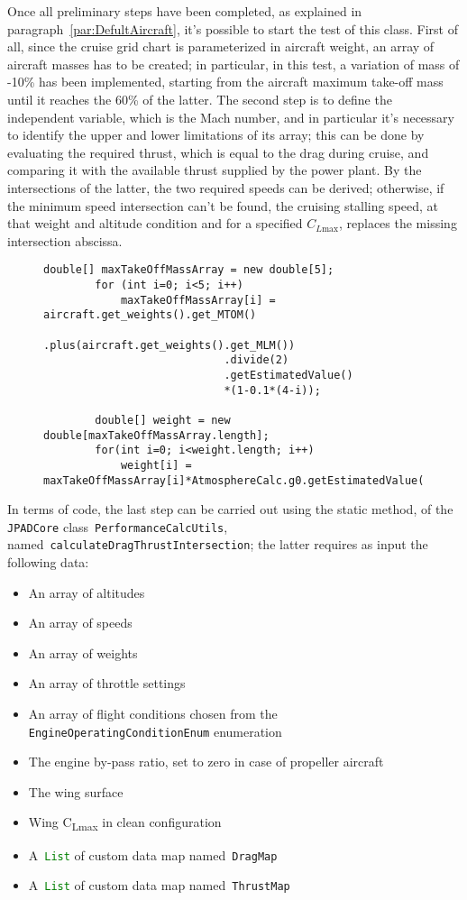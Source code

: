\bigskip
\noindent
Once all preliminary steps have been completed, as explained in paragraph~\ref{par:DefultAircraft}, it's possible to start the test of this class. 
%
First of all, since the cruise grid chart is parameterized in aircraft weight, an array of aircraft masses has to be created; in particular, in this test, a variation of mass of -10\% has been implemented, starting from the aircraft maximum take-off mass until it reaches the 60\% of the latter. 
%
The second step is to define the independent variable, which is the Mach number, and in particular it's necessary to identify the upper and lower limitations of its array; this can be done by evaluating the required thrust, which is equal to the drag during cruise, and comparing it with the available thrust supplied by the power plant.
%
\noindent
By the intersections of the latter, the two required speeds can be derived; otherwise, if the minimum speed intersection can't be found, the cruising stalling speed, at that weight and altitude condition and for a specified $C_{L\text{max}}$, replaces the missing intersection abscissa.
%
\begin{figure}[t]
\begin{lstlisting}[caption={Mass variation in Specific Range test - B747-100B}, captionpos=b, tabsize=2]
		double[] maxTakeOffMassArray = new double[5];
		for (int i=0; i<5; i++)
			maxTakeOffMassArray[i] =	aircraft.get_weights().get_MTOM()
							.plus(aircraft.get_weights().get_MLM())
							.divide(2)
							.getEstimatedValue()
							*(1-0.1*(4-i));

		double[] weight = new double[maxTakeOffMassArray.length];
		for(int i=0; i<weight.length; i++)
			weight[i] = maxTakeOffMassArray[i]*AtmosphereCalc.g0.getEstimatedValue();
\end{lstlisting}
\end{figure}
%
In terms of code, the last step can be carried out using the static method, of the \lstinline[language=Java]!JPADCore! class~\lstinline[language=Java]!PerformanceCalcUtils!, named~\lstinline[language=Java]!calculateDragThrustIntersection!; the latter requires as input the following data:
%
\begin{itemize}
\item An array of altitudes
\item An array of speeds
\item An array of weights
\item An array of throttle settings
\item An array of flight conditions chosen from the \lstinline[language=Java]!EngineOperatingConditionEnum! enumeration
\item The engine by-pass ratio, set to zero in case of propeller aircraft
\item The wing surface
\item Wing C\textsubscript{Lmax} in clean configuration
\item A~\lstinline[language=Java]!List! of custom data map named~\lstinline[language=Java]!DragMap!
\item A~\lstinline[language=Java]!List! of custom data map named~\lstinline[language=Java]!ThrustMap!
\end{itemize}

